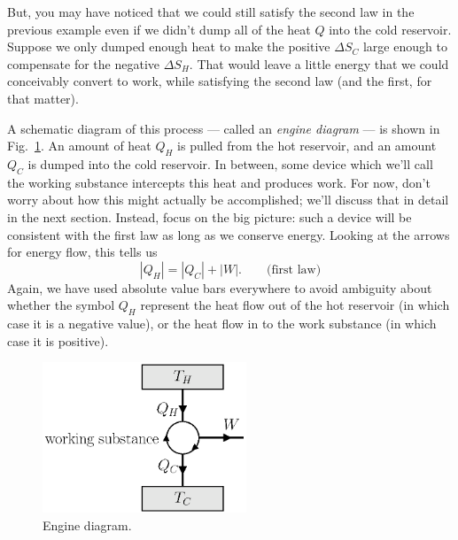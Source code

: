 But, you may have noticed that we could still satisfy the second law
 in the previous example even if we didn't dump all of the heat $Q$
 into the cold reservoir.  Suppose we only dumped enough heat to make
the positive $\Delta S_C$ large enough to compensate for the negative
$\Delta S_H$.  That would leave a little energy that we could conceivably
convert to work, while satisfying the second law (and the first,
for that matter).  

A schematic diagram of this process --- called an {\it engine diagram}
--- is shown in Fig.~\ref{fig:engine_diagram}.  An amount of heat
$Q_H$ is pulled from the hot reservoir, and an amount $Q_C$ is dumped
into the cold reservoir.  In between, some device which we'll call the
working substance intercepts this heat and produces work.  For now,
don't worry about how this might actually be accomplished; we'll
discuss that in detail in the next section.  Instead, focus on the big
picture: such a device will be consistent with the first law as long
as we conserve energy.  Looking at the arrows for energy flow, this
tells us
\begin{equation}
|Q_H| = |Q_C| + |W|. \qquad\text{(first law)}
\end{equation}
Again, we have used absolute value bars everywhere to avoid ambiguity about
whether the symbol $Q_H$ represent the heat flow out of the hot
reservoir (in which case it is a negative value), or the heat flow in
to the work substance (in which case it is positive). 

\begin{figure}
\begin{center}
\includegraphics[width=2.4in]{heat_engines/engine_diagram.eps}
\caption{Engine diagram.}
\label{fig:engine_diagram}
\end{center}
\end{figure}

